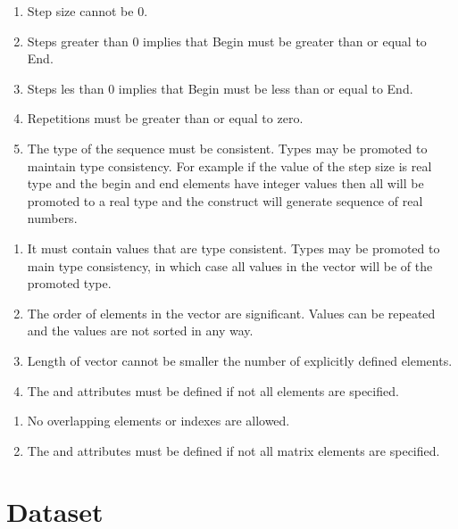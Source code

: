 \begin{valrules}

\begin{enumerate}
\item Step size cannot be 0.
\item Steps greater than 0 implies that Begin must be greater than or equal to End.
\item Steps les than 0 implies that Begin must be less than or equal
  to End.
\item Repetitions must be greater than or equal to zero.
\item The type of the sequence must be consistent. Types may be
  promoted to maintain type consistency. For example if the value of
  the step size is real type and the begin and end elements have
  integer values then all will be promoted to a real type and the
  construct will generate sequence of real numbers.
\end{enumerate}


\begin{enumerate}
\item It must contain values that are type
consistent. Types may be promoted to main type consistency, in which
case all values in the vector will be of the promoted type.
\item The order of elements in the vector are significant. Values can
  be repeated and the values are not sorted in any way.
\item Length of vector cannot be smaller the number of explicitly  defined elements.
\item The  and  attributes must be defined if not all elements are specified.
\end{enumerate}

\begin{enumerate}
\item No overlapping elements or indexes are allowed.
\item The  and  attributes must be defined if not all matrix elements are specified.
\end{enumerate}
\end{valrules}

\section{Dataset}

